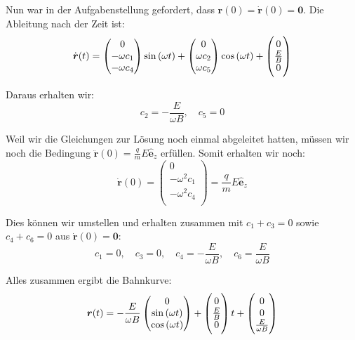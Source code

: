 \documentclass[11pt, ngerman, fleqn]{article}
\newcommand{\ev}{\hat{\vec e}}
\renewcommand{\vec}[1]{\boldsymbol{#1}}
\begin{document}
Nun war in der Aufgabenstellung gefordert, dass $\vec r(0) = \dot{\vec r}(0) =
\vec 0$. Die Ableitung nach der Zeit ist:
\[
	\dot{\vec r}(t) = \begin{pmatrix}
		0 \\
		- \omega c_1 \\
		- \omega c_4 \\
	\end{pmatrix} \sin\del{\omega t}
	+
	\begin{pmatrix}
		0 \\
		\omega c_2 \\
		\omega c_5 \\
	\end{pmatrix} \cos\del{\omega t}
	+
	\begin{pmatrix}
		0 \\
		\frac EB \\
		0 \\
	\end{pmatrix}
\]

Daraus erhalten wir:
\[
	c_2 = - \frac{E}{\omega B}
	,\quad
	c_5 = 0
\]

Weil wir die Gleichungen zur Lösung noch einmal abgeleitet hatten, müssen wir
noch die Bedingung $\ddot{\vec r}(0) = \frac qm E \ev_z$ erfüllen. Somit erhalten wir noch:
\[
	\dot{\vec r}(0) = \begin{pmatrix}
		0 \\
		- \omega^2 c_1 \\
		- \omega^2 c_4 \\
	\end{pmatrix}
	= \frac qm E \ev_z
\]

Dies können wir umstellen und erhalten zusammen mit $c_1 + c_3 = 0$ sowie $c_4
+ c_6 = 0$ aus $\dot{\vec r}(0) = \vec 0$:
\[
	c_1 = 0
	,\quad
	c_3 = 0
	,\quad
	c_4 = - \frac{E}{\omega B}
	, \quad
	c_6 = \frac{E}{\omega B}
\]

Alles zusammen ergibt die Bahnkurve:
\[
	\vec r(t) = - \frac{E}{\omega B} \begin{pmatrix}
		0 \\
		\sin\del{\omega t} \\
		\cos\del{\omega t} \\
	\end{pmatrix}
	+
	\begin{pmatrix}
		0 \\
		\frac EB \\
		0 \\
	\end{pmatrix} t
	+
	\begin{pmatrix}
		0 \\
		0 \\
		\frac{E}{\omega B} \\
	\end{pmatrix}
\]
\end{document}
